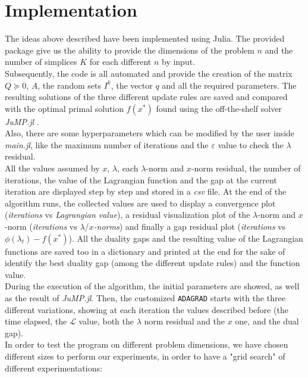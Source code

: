 \documentclass[notitlepage]{article}
\begin{document}
\section{Implementation}
The ideas above described have been implemented using Julia. The provided package give us the ability to provide the dimensions of the problem $n$ and the number of simplices $K$ for each different $n$ by input.\\
Subsequently, the code is all automated and provide the creation of the matrix $Q \succeq 0$, $A$, the random sets $I^k$, the vector $q$ and all the required parameters. The resulting solutions 
of the three different update rules are saved and compared with the optimal primal solution $f(x^*)$ found using the off-the-shelf solver \textit{JuMP.jl} \cite{DunningHuchetteLubin2017}.\\
Also, there are some hyperparameters which can be modified by the user inside \textit{main.jl}, like the maximum number of iterations and the $\varepsilon$ value to check the $\lambda$ residual.\\
All the values assumed by $x$, $\lambda$, each $\lambda$-norm and $x$-norm residual, the number of iterations, the value of the Lagrangian function and the gap at the current iteration are displayed 
step by step and stored in a \textit{csv} file. At the end of the algorithm runs, the collected values are used to display a convergence plot (\textit{iterations} vs \textit{Lagrangian value}), a residual visualization plot of the 
$\lambda$-norm and $x$-norm (\textit{iterations} vs $\lambda$/$x$\textit{-norms}) and finally a gap residual plot (\textit{iterations} vs $\phi(\lambda_t) - f(x^*)$). All the duality gaps and the resulting value 
of the Lagrangian functions are saved too in a dictionary and printed at the end for the sake of identify the best duality gap (among the different update rules) and the function value.\\
During the execution of the algorithm, the initial parameters are showed, as well as the result of \textit{JuMP.jl}. Then, the customized \texttt{ADAGRAD} starts with the three different variations, 
showing at each iteration the values described before (the time elapsed, the $\mathcal{L}$ value, both the $\lambda$ norm residual and the $x$ one, and the dual gap).\\
In order to test the program on different problem dimensions, we have chosen different sizes to perform our experiments, in order to have a "grid search" of different experimentations:
\end{document}
